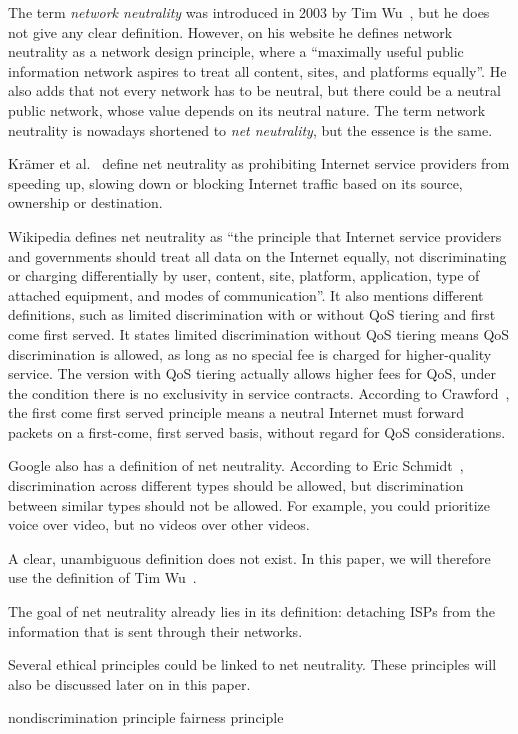 
The term \emph{network neutrality} was introduced in 2003 by Tim Wu~\cite{wu2003network}, but he does not give any clear definition. However, on his website \highlight{[cite]} he defines network neutrality as a network design principle, where a ``maximally useful public information network aspires to treat all content, sites, and platforms equally''. He also adds that not every network has to be neutral, but there could be a neutral public network, whose value depends on its neutral nature. The term network neutrality is nowadays shortened to \emph{net neutrality}, but the essence is the same.

Kr\"amer et al.~\cite{kramer2013net} define net neutrality as prohibiting Internet service providers from speeding up, slowing down or blocking Internet traffic based on its source, ownership or destination.

Wikipedia \highlight{[cite]} defines net neutrality as ``the principle that Internet service providers and governments should treat all data on the Internet equally, not discriminating or charging differentially by user, content, site, platform, application, type of attached equipment, and modes of communication''. It also mentions different definitions, such as limited discrimination with or without \ac{QoS} tiering and first come first served. It states limited discrimination without \ac{QoS} tiering means \ac{QoS} discrimination is allowed, as long as no special fee is charged for higher-quality service. The version with \ac{QoS} tiering actually allows higher fees for \ac{QoS}, under the condition there is no exclusivity in service contracts. According to Crawford~\highlight{[cite]}, the first come first served principle means a neutral Internet must forward packets on a first-come, first served basis, without regard for \ac{QoS} considerations.

Google also has a definition of net neutrality. According to Eric Schmidt~\highlight{[cite]}, discrimination across different types should be allowed, but discrimination between similar types should not be allowed. For example, you could prioritize voice over video, but no videos over other videos.

A clear, unambiguous definition does not exist. In this paper, we will therefore use the definition of Tim Wu~\highlight{[cite]}.

The goal of net neutrality already lies in its definition: detaching \acp{ISP} from the information that is sent through their networks.

Several ethical principles could be linked to net neutrality. These principles will also be discussed later on in this paper.

 nondiscrimination principle
 fairness principle
